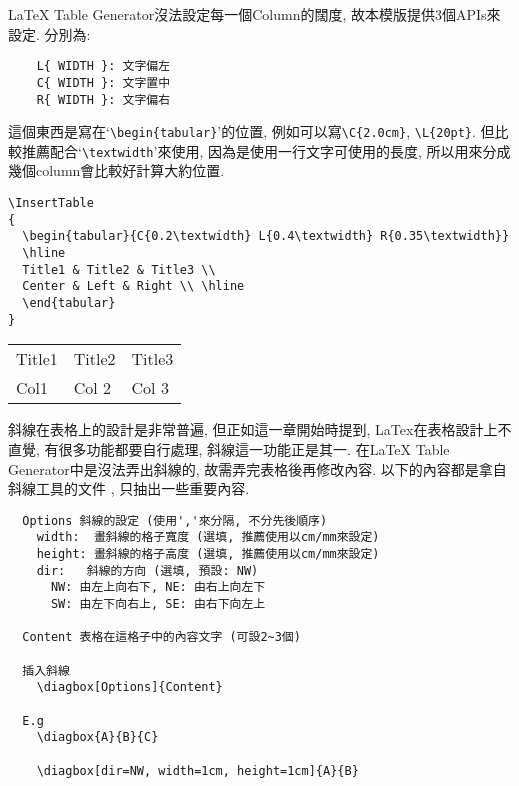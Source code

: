 \newpage
{}

LaTeX Table Generator沒法設定每一個Column的闊度, 故本模版提供3個APIs來設定. 分別為:
  \begin{verbatim}
    L{ WIDTH }: 文字偏左
    C{ WIDTH }: 文字置中
    R{ WIDTH }: 文字偏右
  \end{verbatim}
這個東西是寫在`\verb|\begin{tabular}|'的位置, 例如可以寫\verb|\C{2.0cm}|, \verb|\L{20pt}|. 但比較推薦配合`\verb|\textwidth|'來使用, 因為是使用一行文字可使用的長度, 所以用來分成幾個column會比較好計算大約位置.

\begin{verbatim}
\InsertTable
{
  \begin{tabular}{C{0.2\textwidth} L{0.4\textwidth} R{0.35\textwidth}}
  \hline
  Title1 & Title2 & Title3 \\
  Center & Left & Right \\ \hline
  \end{tabular}
}
\end{verbatim}

    \InsertTable
      {
        \begin{tabular}{C{0.2\textwidth} L{0.4\textwidth} R{0.35\textwidth}}
        \hline
        Title1 & Title2 & Title3 \\
        Col1 & Col 2 & Col 3 \\ \hline
        \end{tabular}
      }

\newpage
{}

斜線在表格上的設計是非常普遍, 但正如這一章開始時提到, LaTex在表格設計上不直覺, 有很多功能都要自行處理, 斜線這一功能正是其一. 在LaTeX Table Generator中是沒法弄出斜線的, 故需弄完表格後再修改內容. 以下的內容都是拿自斜線工具的文件 , 只抽出一些重要內容.\\

  \begin{DescriptionFrame}
  \begin{verbatim}
  Options 斜線的設定 (使用','來分隔, 不分先後順序)
    width:  畫斜線的格子寬度 (選填, 推薦使用以cm/mm來設定)
    height: 畫斜線的格子高度 (選填, 推薦使用以cm/mm來設定)
    dir:   斜線的方向 (選填, 預設: NW)
      NW: 由左上向右下, NE: 由右上向左下
      SW: 由左下向右上, SE: 由右下向左上

  Content 表格在這格子中的內容文字 (可設2~3個)

  插入斜線
    \diagbox[Options]{Content}

  E.g
    \diagbox{A}{B}{C}

    \diagbox[dir=NW, width=1cm, height=1cm]{A}{B}
  \end{verbatim}
  \end{DescriptionFrame}

